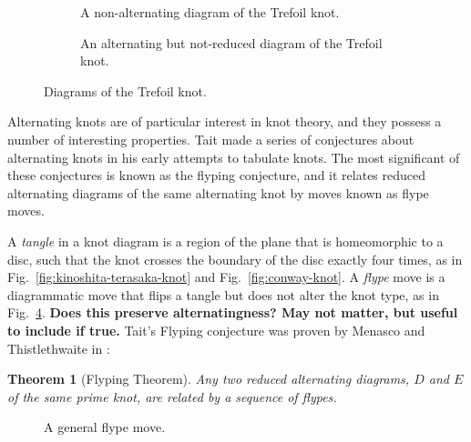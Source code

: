 \documentclass[12pt]{report}
\newcommand{\notered}[1]{{\color{Red} \textbf{#1}}}
\newtheorem*{theorem}{Theorem}
\begin{document}
\begin{figure}[hbt!]
	\centering
	\hspace*{\fill}
	\begin{subfigure}[b]{0.4 \textwidth}
		\centering
		\def\svgscale{0.23}
		
		\caption{A non-alternating diagram of the Trefoil knot.}
		\label{fig:trefoil-nonalternating}
	\end{subfigure}
	\hspace*{\fill} \hspace*{\fill}	\hspace*{\fill}
	\begin{subfigure}[b]{0.4 \textwidth}
		\centering
		\def\svgscale{0.23}
		
		\caption{An alternating but not-reduced diagram of the Trefoil knot.}
		\label{fig:trefoil-nugatory}
	\end{subfigure}
	\hspace*{\fill} 
	\caption{Diagrams of the Trefoil knot.}
	\label{fig:trefoil-diagrams}
\end{figure}

Alternating knots are of particular interest in knot theory, and they possess a number of interesting properties. Tait made a series of conjectures about alternating knots in his early attempts to tabulate knots. The most significant of these conjectures is known as the flyping conjecture, and it relates reduced alternating diagrams of the same alternating knot by moves known as flype moves.

A \textit{tangle} in a knot diagram is a region of the plane that is homeomorphic to a disc, such that the knot crosses the boundary of the disc exactly four times, as in Fig.~\ref{fig:kinoshita-terasaka-knot} and Fig.~\ref{fig:conway-knot}. A \textit{flype} move is a diagrammatic move that flips a tangle but does not alter the knot type, as in Fig.~\ref{fig:flype}. \notered{Does this preserve alternatingness? May not matter, but useful to include if true.} Tait's Flyping conjecture was proven by Menasco and Thistlethwaite in \cite[p. 166]{classification-alternating-links}:

\begin{theorem}[Flyping Theorem]
Any two reduced alternating diagrams, $D$ and $E$ of the same prime knot, are related by a sequence of flypes.
\end{theorem}

\begin{figure}[hbt]
	\centering
	\def\svgscale{0.5}
	
	\caption{A general flype move.}
	\label{fig:flype}
\end{figure}
\end{document}

